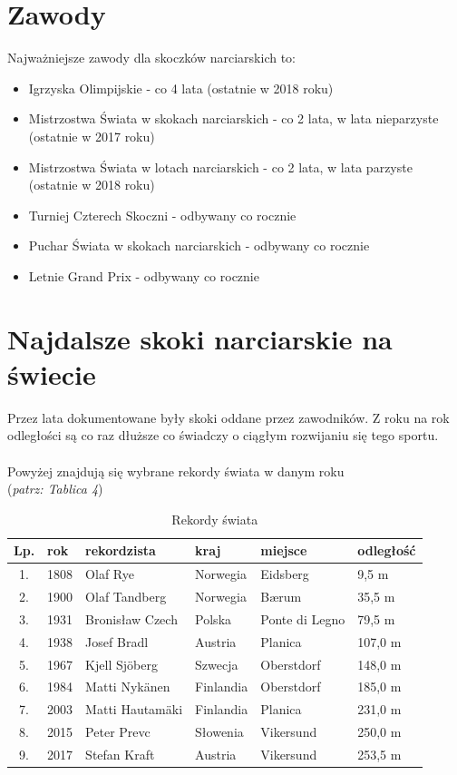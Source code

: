 \documentclass[11pt]{article}
\begin{document}
\section{Zawody}\label{zawody}
Najważniejsze zawody dla skoczków narciarskich to: 
\begin{itemize}
\item Igrzyska Olimpijskie - co 4 lata (ostatnie w 2018 roku)
\item Mistrzostwa Świata w skokach narciarskich - co 2 lata, w lata nieparzyste (ostatnie w 2017 roku)
\item Mistrzostwa Świata w lotach narciarskich - co 2 lata, w lata parzyste (ostatnie w 2018 roku)
\item Turniej Czterech Skoczni - odbywany co rocznie
\item Puchar Świata w skokach narciarskich - odbywany co rocznie
\item Letnie Grand Prix - odbywany co rocznie
\end{itemize}
\newpage
\section{Najdalsze skoki narciarskie na świecie}
Przez lata dokumentowane były skoki oddane przez zawodników. Z roku na rok odległości są co raz dłuższe co świadczy o ciągłym rozwijaniu się tego sportu.
\\\\
Powyżej znajdują się wybrane rekordy świata w danym roku \\(\textit{\small patrz: Tablica 4})
\begin{table}
\caption{Rekordy świata}
\begin{center}
\begin{tabular}{|c|l|l|l|l|l|}
\hline Lp. & rok & rekordzista & kraj & miejsce & odległość \\ \hline \hline
1. & 1808 & Olaf Rye & Norwegia & Eidsberg & 9,5 m \\ 
2. & 1900 & Olaf Tandberg & Norwegia & Bærum & 35,5 m \\
3. & 1931 & Bronisław Czech & Polska & Ponte di Legno & 79,5 m \\
4. & 1938 & Josef Bradl & Austria & Planica & 107,0 m \\
5. & 1967 & Kjell Sjöberg & Szwecja & Oberstdorf & 148,0 m \\
6. & 1984 & Matti Nykänen & Finlandia & Oberstdorf & 185,0 m \\
7. & 2003 & Matti Hautamäki & Finlandia & Planica & 231,0 m \\
8. & 2015 & Peter Prevc & Słowenia & Vikersund & 250,0 m \\
9. & 2017 & Stefan Kraft & Austria & Vikersund & 253,5 m \\
\hline
\end{tabular}
\end{center}
\end{table}
\end{document}
